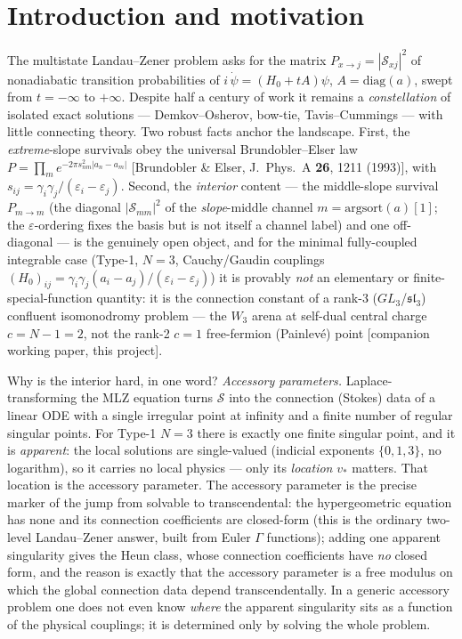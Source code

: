 \documentclass[aps,prl,reprint,nofootinbib,superscriptaddress]{revtex4-2}
\newcommand{\eps}{\varepsilon}
\newcommand{\Scat}{\mathcal{S}}
\newcommand{\Pmid}{P_{m\to m}}
\newcommand{\diag}{\mathrm{diag}}
\begin{document}
\section{Introduction and motivation}
The multistate Landau--Zener problem asks for the matrix $P_{x\to j}=|\Scat_{xj}|^2$ of nonadiabatic
transition probabilities of $i\,\dot\psi=(H_0+tA)\psi$, $A=\diag(a)$, swept from $t=-\infty$ to
$+\infty$. Despite half a century of work it remains a \emph{constellation} of isolated exact
solutions --- Demkov--Osherov, bow-tie, Tavis--Cummings --- with little connecting theory. Two robust
facts anchor the landscape. First, the \emph{extreme}-slope survivals obey the universal
Brundobler--Elser law $P=\prod_m e^{-2\pi s_{nm}^2|a_n-a_m|}$ [Brundobler \& Elser, J.\ Phys.\ A
\textbf{26}, 1211 (1993)], with $s_{ij}=\gamma_i\gamma_j/(\eps_i-\eps_j)$. Second, the
\emph{interior} content --- the middle-slope survival $\Pmid$ (the diagonal $|\Scat_{mm}|^2$ of the
\emph{slope}-middle channel $m=\mathrm{argsort}(a)[1]$; the $\eps$-ordering fixes the basis but is not
itself a channel label) and one off-diagonal --- is the genuinely
open object, and for the minimal fully-coupled integrable case (Type-1, $N{=}3$, Cauchy/Gaudin
couplings $(H_0)_{ij}=\gamma_i\gamma_j(a_i-a_j)/(\eps_i-\eps_j)$) it is provably \emph{not} an
elementary or finite-special-function quantity: it is the connection constant of a rank-3
($GL_3$/$\mathfrak{sl}_3$) confluent isomonodromy problem --- the $W_3$ arena at self-dual central
charge $c=N{-}1=2$, not the rank-2 $c{=}1$ free-fermion (Painlev\'e) point [companion working paper,
this project].

Why is the interior hard, in one word? \emph{Accessory parameters.} Laplace-transforming the MLZ
equation turns $\Scat$ into the connection (Stokes) data of a linear ODE with a single irregular point
at infinity and a finite number of regular singular points. For Type-1 $N{=}3$ there is exactly one
finite singular point, and it is \emph{apparent}: the local solutions are single-valued
(indicial exponents $\{0,1,3\}$, no logarithm), so it carries no local physics --- only its
\emph{location} $v_*$ matters. That location is the accessory parameter. The accessory parameter is
the precise marker of the jump from solvable to transcendental: the hypergeometric equation has none
and its connection coefficients are closed-form (this is the ordinary two-level Landau--Zener answer,
built from Euler $\Gamma$ functions); adding one apparent singularity gives the Heun class, whose
connection coefficients have \emph{no} closed form, and the reason is exactly that the accessory
parameter is a free modulus on which the global connection data depend transcendentally. In a generic
accessory problem one does not even know \emph{where} the apparent singularity sits as a function of
the physical couplings; it is determined only by solving the whole problem.
\end{document}
